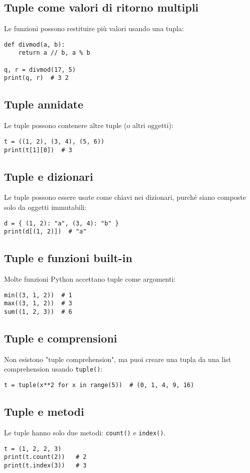 \documentclass[a4paper,12pt]{article}
\begin{document}
\subsection*{Tuple come valori di ritorno multipli}
Le funzioni possono restituire più valori usando una tupla:
\begin{lstlisting}
def divmod(a, b):
    return a // b, a % b

q, r = divmod(17, 5)
print(q, r)  # 3 2
\end{lstlisting}

\subsection*{Tuple annidate}
Le tuple possono contenere altre tuple (o altri oggetti):
\begin{lstlisting}
t = ((1, 2), (3, 4), (5, 6))
print(t[1][0])  # 3
\end{lstlisting}

\subsection*{Tuple e dizionari}
Le tuple possono essere usate come chiavi nei dizionari, purché siano composte solo da oggetti immutabili:
\begin{lstlisting}
d = { (1, 2): "a", (3, 4): "b" }
print(d[(1, 2)])  # "a"
\end{lstlisting}

\subsection*{Tuple e funzioni built-in}
Molte funzioni Python accettano tuple come argomenti:
\begin{lstlisting}
min((3, 1, 2))  # 1
max((3, 1, 2))  # 3
sum((1, 2, 3))  # 6
\end{lstlisting}

\subsection*{Tuple e comprensioni}
Non esistono "tuple comprehension", ma puoi creare una tupla da una list comprehension usando \texttt{tuple()}:
\begin{lstlisting}
t = tuple(x**2 for x in range(5))  # (0, 1, 4, 9, 16)
\end{lstlisting}

\subsection*{Tuple e metodi}
Le tuple hanno solo due metodi: \texttt{count()} e \texttt{index()}.
\begin{lstlisting}
t = (1, 2, 2, 3)
print(t.count(2))   # 2
print(t.index(3))   # 3
\end{lstlisting}
\end{document}
